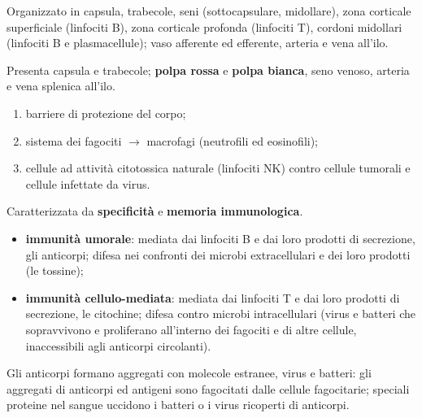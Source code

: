 Organizzato in capsula, trabecole, seni (sottocapsulare, midollare), zona corticale superficiale (linfociti B), zona corticale profonda (linfociti T), cordoni midollari (linfociti B e plasmacellule); vaso afferente ed efferente, arteria e vena all'ilo.

Presenta capsula e trabecole; \textbf{polpa rossa} e \textbf{polpa bianca}, seno venoso, arteria e vena splenica all'ilo.

\begin{enumerate}
  \item barriere di protezione del corpo;
  \item sistema dei fagociti $\rightarrow$ macrofagi (neutrofili ed eosinofili);
  \item cellule ad attività citotossica naturale (linfociti NK) contro cellule tumorali e cellule infettate da virus.
\end{enumerate}

Caratterizzata da \textbf{specificità} e \textbf{memoria immunologica}.
\begin{itemize}
  \item \textbf{immunità umorale}: mediata dai linfociti B e dai loro prodotti di secrezione, gli anticorpi; difesa nei confronti dei microbi extracellulari e dei loro prodotti (le tossine);
  \item \textbf{immunità cellulo-mediata}: mediata dai linfociti T e dai loro prodotti di secrezione, le citochine; difesa contro microbi intracellulari (virus e batteri che sopravvivono e proliferano all'interno dei fagociti e di altre cellule, inaccessibili agli anticorpi circolanti).
\end{itemize}

Gli anticorpi formano aggregati con molecole estranee, virus e batteri: gli aggregati di anticorpi ed antigeni sono fagocitati dalle cellule fagocitarie; speciali proteine nel sangue uccidono i batteri o i virus ricoperti di anticorpi.
